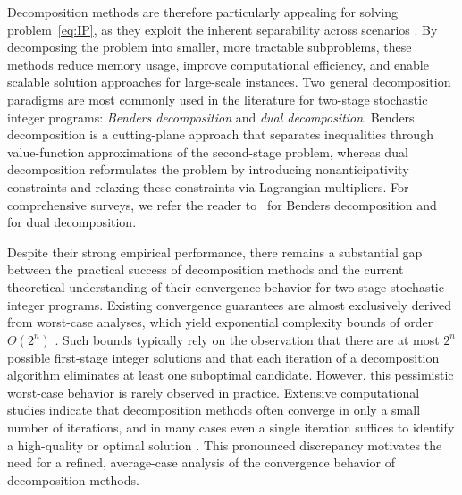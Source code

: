 \documentclass{article}
\newcommand{\R}{\mathbb{R}}
\newcommand{\xv}[0]{\mathbf{x}}
\newtheorem{assumption}[thm]{Assumption}
\begin{document}
Decomposition methods are therefore particularly appealing for solving
problem~\eqref{eq:IP}, as they exploit the inherent separability across scenarios \cite{boland2018combining,kim2022scalable,kuccukyavuz2017introduction,cifuentes2025lagrangian,rahmaniani2017benders,dey2018analysis}.
By decomposing the problem into smaller, more tractable subproblems, these methods
reduce memory usage, improve computational efficiency, and enable scalable solution
approaches for large-scale instances.
Two general decomposition paradigms are most commonly used in the literature for
two-stage stochastic integer programs: \emph{Benders decomposition} and
\emph{dual decomposition}. Benders decomposition is a cutting-plane approach that separates inequalities through
value-function approximations of the second-stage problem, whereas dual
decomposition reformulates the problem by introducing nonanticipativity
constraints and relaxing these constraints via Lagrangian multipliers.
For comprehensive surveys, we refer the reader to~\cite{rahmaniani2017benders} for Benders decomposition
and~\cite{bragin2024survey} for dual decomposition.

Despite their strong empirical performance, there remains a substantial gap
between the practical success of decomposition methods and the current theoretical
understanding of their convergence behavior for two-stage stochastic integer
programs.
Existing convergence guarantees are almost exclusively derived from worst-case
analyses, which yield exponential complexity bounds of order $\Theta(2^n)$ \cite{sun2024decomposition,zou2019stochastic}.
Such bounds typically rely on the observation that there are at most $2^n$ possible
first-stage integer solutions and that each iteration of a decomposition algorithm
eliminates at least one suboptimal candidate.
However, this pessimistic worst-case behavior is rarely observed in practice.
Extensive computational studies indicate that decomposition methods often converge
in only a small number of iterations, and in many cases even a single iteration
suffices to identify a high-quality or optimal solution \cite{kim2022scalable}.
This pronounced discrepancy motivates the need for a refined, average-case
analysis of the convergence behavior of decomposition methods.
\end{document}
